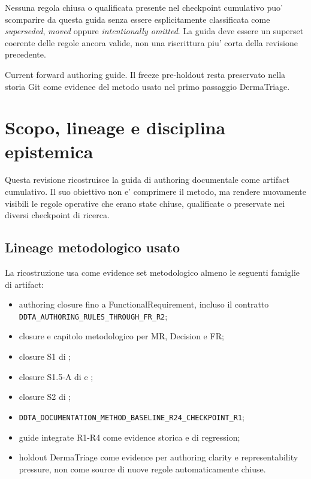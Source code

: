 \documentclass[11pt,a4paper]{article}
\begin{document}
\begin{titlepage}
\vfill
\begin{ddtacore}[title={Regola di costruzione di questa revisione}]
Nessuna regola chiusa o qualificata presente nel checkpoint cumulativo puo' scomparire da questa guida senza essere esplicitamente classificata come \emph{superseded}, \emph{moved} oppure \emph{intentionally omitted}. La guida deve essere un superset coerente delle regole ancora valide, non una riscrittura piu' corta della revisione precedente.
\end{ddtacore}

\begin{flushright}
\sffamily\small\color{DDTAGray}Current forward authoring guide. Il freeze pre-holdout resta preservato nella storia Git come evidence del metodo usato nel primo passaggio DermaTriage.
\end{flushright}
\end{titlepage}

\tableofcontents
\clearpage

\section{Scopo, lineage e disciplina epistemica}

Questa revisione ricostruisce la guida di authoring documentale come artifact cumulativo. Il suo obiettivo non e' comprimere il metodo, ma rendere nuovamente visibili le regole operative che erano state chiuse, qualificate o preservate nei diversi checkpoint di ricerca.

\subsection{Lineage metodologico usato}

La ricostruzione usa come evidence set metodologico almeno le seguenti famiglie di artifact:

\begin{itemize}
  \item authoring closure fino a FunctionalRequirement, incluso il contratto \nolinkurl{DDTA_AUTHORING_RULES_THROUGH_FR_R2};
  \item closure e capitolo metodologico per MR, Decision e FR;
  \item closure S1 di \SR;
  \item closure S1.5-A di \REQ{} e \NC{};
  \item closure S2 di \SECR;
  \item \texttt{DDTA\_DOCUMENTATION\_METHOD\_BASELINE\_R24\_CHECKPOINT\_R1};
  \item guide integrate R1-R4 come evidence storica e di regression;
  \item holdout DermaTriage come evidence per authoring clarity e representability pressure, non come source di nuove regole automaticamente chiuse.
\end{itemize}
\end{document}
